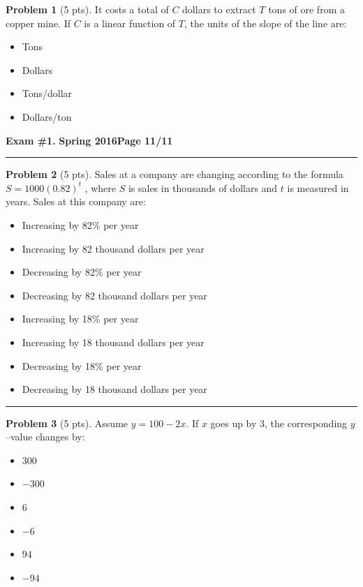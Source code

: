 \documentclass[12pt]{article}
\makeatletter
\theoremstyle{definition}
\newtheorem{problem}{Problem}
\newcommand*{\radiobutton}{%
  \@ifstar{\@radiobutton0}{\@radiobutton1}%
}
\newcommand*{\@radiobutton}[1]{%
  \begin{tikzpicture}
    \pgfmathsetlengthmacro\radius{height("X")/2}
    \draw[radius=\radius] circle;
    \ifcase#1 \fill[radius=.6*\radius] circle;\fi
  \end{tikzpicture}%
}
\makeatother
\begin{document}
\begin{problem}[5 pts]
It costs a total of $C$ dollars to extract $T$ tons of ore from a copper mine. If $C$ is a linear function of $T$, the units of the slope of the line are:
\begin{itemize}
\item[\radiobutton] Tons
\item[\radiobutton] Dollars
\item[\radiobutton] Tons/dollar
\item[\radiobutton] Dollars/ton
\end{itemize}
\end{problem}
\newpage

\hfill{\large\bf Exam \#1.}\hfill{\large\bf
  Spring 2016}\hfill{\large\bf Page 11/11}\hrule

\begin{problem}[5 pts]
Sales at a company are changing according to the formula $S = 1000 (0.82)^t$ , where $S$ is sales in thousands of dollars and $t$ is measured in years. Sales at this company are:
\begin{itemize}
\item[\radiobutton] Increasing by 82\% per year
\item[\radiobutton] Increasing by 82 thousand dollars per year
\item[\radiobutton] Decreasing by 82\% per year
\item[\radiobutton] Decreasing by 82 thousand dollars per year
\item[\radiobutton] Increasing by 18\% per year
\item[\radiobutton] Increasing by 18 thousand dollars per year
\item[\radiobutton] Decreasing by 18\% per year
\item[\radiobutton] Decreasing by 18 thousand dollars per year
\end{itemize} 
\end{problem}

\vspace{4cm}
\hrule

\begin{problem}[5 pts]
Assume $y = 100 - 2x$. If $x$ goes up by 3, the corresponding $y$--value changes by:
\begin{itemize}
\item[\radiobutton] $300$
\item[\radiobutton] $-300$
\item[\radiobutton] $6$
\item[\radiobutton] $-6$
\item[\radiobutton] $94$
\item[\radiobutton] $-94$
\end{itemize} 
\end{problem}
\end{document}
